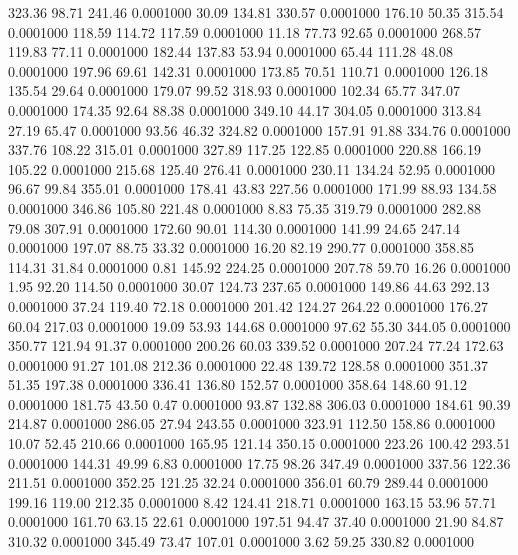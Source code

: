  323.36   98.71  241.46   0.0001000
  30.09  134.81  330.57   0.0001000
 176.10   50.35  315.54   0.0001000
 118.59  114.72  117.59   0.0001000
  11.18   77.73   92.65   0.0001000
 268.57  119.83   77.11   0.0001000
 182.44  137.83   53.94   0.0001000
  65.44  111.28   48.08   0.0001000
 197.96   69.61  142.31   0.0001000
 173.85   70.51  110.71   0.0001000
 126.18  135.54   29.64   0.0001000
 179.07   99.52  318.93   0.0001000
 102.34   65.77  347.07   0.0001000
 174.35   92.64   88.38   0.0001000
 349.10   44.17  304.05   0.0001000
 313.84   27.19   65.47   0.0001000
  93.56   46.32  324.82   0.0001000
 157.91   91.88  334.76   0.0001000
 337.76  108.22  315.01   0.0001000
 327.89  117.25  122.85   0.0001000
 220.88  166.19  105.22   0.0001000
 215.68  125.40  276.41   0.0001000
 230.11  134.24   52.95   0.0001000
  96.67   99.84  355.01   0.0001000
 178.41   43.83  227.56   0.0001000
 171.99   88.93  134.58   0.0001000
 346.86  105.80  221.48   0.0001000
   8.83   75.35  319.79   0.0001000
 282.88   79.08  307.91   0.0001000
 172.60   90.01  114.30   0.0001000
 141.99   24.65  247.14   0.0001000
 197.07   88.75   33.32   0.0001000
  16.20   82.19  290.77   0.0001000
 358.85  114.31   31.84   0.0001000
   0.81  145.92  224.25   0.0001000
 207.78   59.70   16.26   0.0001000
   1.95   92.20  114.50   0.0001000
  30.07  124.73  237.65   0.0001000
 149.86   44.63  292.13   0.0001000
  37.24  119.40   72.18   0.0001000
 201.42  124.27  264.22   0.0001000
 176.27   60.04  217.03   0.0001000
  19.09   53.93  144.68   0.0001000
  97.62   55.30  344.05   0.0001000
 350.77  121.94   91.37   0.0001000
 200.26   60.03  339.52   0.0001000
 207.24   77.24  172.63   0.0001000
  91.27  101.08  212.36   0.0001000
  22.48  139.72  128.58   0.0001000
 351.37   51.35  197.38   0.0001000
 336.41  136.80  152.57   0.0001000
 358.64  148.60   91.12   0.0001000
 181.75   43.50    0.47   0.0001000
  93.87  132.88  306.03   0.0001000
 184.61   90.39  214.87   0.0001000
 286.05   27.94  243.55   0.0001000
 323.91  112.50  158.86   0.0001000
  10.07   52.45  210.66   0.0001000
 165.95  121.14  350.15   0.0001000
 223.26  100.42  293.51   0.0001000
 144.31   49.99    6.83   0.0001000
  17.75   98.26  347.49   0.0001000
 337.56  122.36  211.51   0.0001000
 352.25  121.25   32.24   0.0001000
 356.01   60.79  289.44   0.0001000
 199.16  119.00  212.35   0.0001000
   8.42  124.41  218.71   0.0001000
 163.15   53.96   57.71   0.0001000
 161.70   63.15   22.61   0.0001000
 197.51   94.47   37.40   0.0001000
  21.90   84.87  310.32   0.0001000
 345.49   73.47  107.01   0.0001000
   3.62   59.25  330.82   0.0001000
